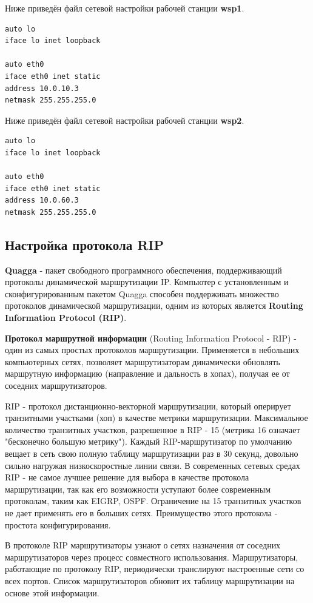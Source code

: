 \documentclass[a4paper,12pt]{article}
\begin{document}
Ниже приведён файл сетевой настройки рабочей станции \textbf{wsp1}.

\begin{Verbatim}
auto lo
iface lo inet loopback

auto eth0
iface eth0 inet static
address 10.0.10.3
netmask 255.255.255.0
\end{Verbatim}

Ниже приведён файл сетевой настройки рабочей станции \textbf{wsp2}.

\begin{Verbatim}
auto lo
iface lo inet loopback

auto eth0
iface eth0 inet static
address 10.0.60.3
netmask 255.255.255.0
\end{Verbatim}


\subsection{Настройка протокола RIP}

\textbf{Quagga} - пакет свободного программного обеспечения, поддерживающий протоколы динамической маршрутизации IP. Компьютер с установленным и сконфигурированным пакетом Quagga способен поддерживать множество протоколов динамической маршрутизации, одним из которых является \textbf{Routing Information Protocol (RIP)}.

\textbf{Протокол маршрутной информации} (Routing Information Protocol - RIP) - один из самых простых протоколов маршрутизации. Применяется в небольших компьютерных сетях, позволяет маршрутизаторам динамически обновлять маршрутную информацию (направление и дальность в хопах), получая ее от соседних маршрутизаторов.

RIP - протокол дистанционно-векторной маршрутизации, который оперирует транзитными участками (хоп) в качестве метрики маршрутизации. Максимальное количество транзитных участков, разрешенное в RIP - 15 (метрика 16 означает "бесконечно большую метрику"). Каждый RIP-маршрутизатор по умолчанию вещает в сеть свою полную таблицу маршрутизации раз в 30 секунд, довольно сильно нагружая низкоскоростные линии связи. В современных сетевых средах RIP - не самое лучшее решение для выбора в качестве протокола маршрутизации, так как его возможности уступают более современным протоколам, таким как EIGRP, OSPF. Ограничение на 15 транзитных участков не дает применять его в больших сетях. Преимущество этого протокола - простота конфигурирования.

В протоколе RIP маршрутизаторы узнают о сетях назначения от соседних маршрутизаторов через процесс совместного использования. Маршрутизаторы, работающие по протоколу RIP, периодически транслируют настроенные сети со всех портов. Список маршрутизаторов обновит их таблицу маршрутизации на основе этой информации.
\end{document}
